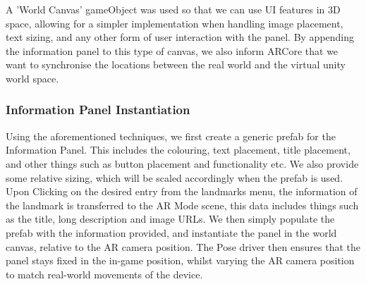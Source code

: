  A 'World Canvas' gameObject was used so that we can use UI features in 3D space, allowing for a simpler implementation when handling image placement, text sizing, 
 and any other form of user interaction with the panel. By appending the information panel to this type of canvas, we also inform ARCore that we want to synchronise 
 the locations between the real world and the virtual unity world space.

 \subsubsection{Information Panel Instantiation}
 Using the aforementioned techniques, we first create a generic prefab for the Information Panel. This includes the colouring, text placement, title placement, and 
 other things such as button placement and functionality etc. We also provide some relative sizing, which will be scaled accordingly when the prefab is used.\\
 Upon Clicking on the desired entry from the landmarks menu, the information of the landmark is transferred to the AR Mode scene, this data includes things such as 
 the title, long description and image URLs. We then simply populate the prefab with the information provided, and instantiate the panel in the world canvas, 
 relative to the AR camera position. The Pose driver then ensures that the panel stays fixed in the in-game position, whilst varying the AR camera position to 
 match real-world movements of the device. 




